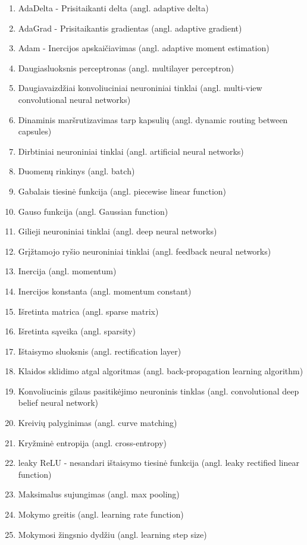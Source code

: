 
\begin{enumerate}
	\item AdaDelta - Prisitaikanti delta (angl. adaptive delta)
	\item AdaGrad - Prisitaikantis gradientas (angl. adaptive gradient)
	\item Adam - Inercijos apskaičiavimas (angl. adaptive moment estimation)
	\item Daugiasluoksnis perceptronas (angl. multilayer perceptron)
	\item Daugiavaizdžiai konvoliuciniai neuroniniai tinklai (angl. multi-view convolutional neural networks)
	\item Dinaminis maršrutizavimas tarp kapsulių (angl. dynamic routing between capsules)
	\item Dirbtiniai neuroniniai tinklai (angl. artificial neural networks)
	\item Duomenų rinkinys (angl. batch)
	\item Gabalais tiesinė funkcija (angl. piecewise linear function)
	\item Gauso funkcija (angl. Gaussian function)
	\item Gilieji neuroniniai tinklai (angl. deep neural networks)
	\item Grįžtamojo ryšio neuroniniai tinklai (angl. feedback neural networks)
	\item Inercija (angl. momentum)
	\item Inercijos konstanta (angl. momentum constant)
	\item Išretinta matrica (angl. sparse matrix)
	\item Išretinta sąveika (angl. sparsity)
	\item Ištaisymo sluoksnis (angl. rectification layer)
	\item Klaidos sklidimo atgal algoritmas (angl. back-propagation learning algorithm)
	\item Konvoliucinis gilaus pasitikėjimo neuroninis tinklas (angl. convolutional deep belief neural network)
	\item Kreivių palyginimas (angl. curve matching)
	\item Kryžminė entropija (angl. cross-entropy)
	\item leaky ReLU - nesandari ištaisymo tiesinė funkcija (angl. leaky rectified linear function)
	\item Maksimalus sujungimas (angl. max pooling)
	\item Mokymo greitis (angl. learning rate function)
	\item Mokymosi žingsnio dydžiu (angl. learning step size)

\end{enumerate}
